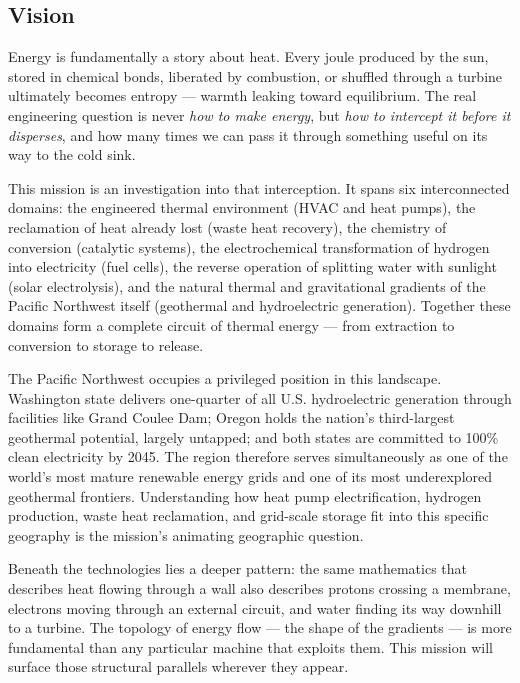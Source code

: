 \documentclass[11pt,letterpaper]{article}
\begin{document}
\subsection{Vision}

Energy is fundamentally a story about heat. Every joule produced by the sun, stored in chemical bonds, liberated by combustion, or shuffled through a turbine ultimately becomes entropy — warmth leaking toward equilibrium. The real engineering question is never \textit{how to make energy}, but \textit{how to intercept it before it disperses}, and how many times we can pass it through something useful on its way to the cold sink.

This mission is an investigation into that interception. It spans six interconnected domains: the engineered thermal environment (HVAC and heat pumps), the reclamation of heat already lost (waste heat recovery), the chemistry of conversion (catalytic systems), the electrochemical transformation of hydrogen into electricity (fuel cells), the reverse operation of splitting water with sunlight (solar electrolysis), and the natural thermal and gravitational gradients of the Pacific Northwest itself (geothermal and hydroelectric generation). Together these domains form a complete circuit of thermal energy — from extraction to conversion to storage to release.

The Pacific Northwest occupies a privileged position in this landscape. Washington state delivers one-quarter of all U.S. hydroelectric generation through facilities like Grand Coulee Dam; Oregon holds the nation's third-largest geothermal potential, largely untapped; and both states are committed to 100\% clean electricity by 2045. The region therefore serves simultaneously as one of the world's most mature renewable energy grids and one of its most underexplored geothermal frontiers. Understanding how heat pump electrification, hydrogen production, waste heat reclamation, and grid-scale storage fit into this specific geography is the mission's animating geographic question.

Beneath the technologies lies a deeper pattern: the same mathematics that describes heat flowing through a wall also describes protons crossing a membrane, electrons moving through an external circuit, and water finding its way downhill to a turbine. The topology of energy flow — the shape of the gradients — is more fundamental than any particular machine that exploits them. This mission will surface those structural parallels wherever they appear.
\end{document}
